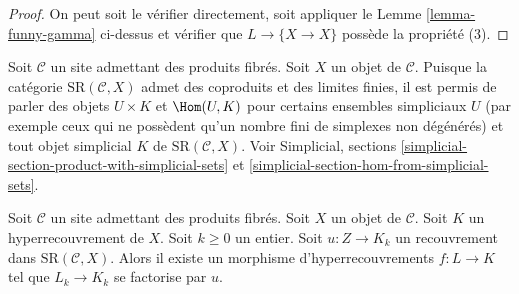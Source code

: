 \begin{proof}
On peut soit le vérifier directement, soit appliquer le
Lemme \ref{lemma-funny-gamma} ci-dessus et vérifier que $L \to \{X \to X\}$
possède la propriété (3).
\end{proof}


\noindent
Soit $\mathcal{C}$ un site admettant des produits fibrés.
Soit $X$ un objet de $\mathcal{C}$.
Puisque la catégorie $\text{SR}(\mathcal{C}, X)$ admet des coproduits et des
limites finies, il est permis de parler des objets
$U \times K$ et $\Hom(U, K)$ pour certains ensembles simpliciaux $U$
(par exemple ceux qui ne possèdent qu'un nombre fini de simplexes non dégénérés)
et tout objet simplicial $K$ de $\text{SR}(\mathcal{C}, X)$.
Voir Simplicial, sections
\ref{simplicial-section-product-with-simplicial-sets} et
\ref{simplicial-section-hom-from-simplicial-sets}.

\begin{lemma}
\label{lemma-covering}
Soit $\mathcal{C}$ un site admettant des produits fibrés.
Soit $X$ un objet de $\mathcal{C}$.
Soit $K$ un hyperrecouvrement de $X$.
Soit $k \geq 0$ un entier.
Soit $u : Z \to K_k$ un recouvrement
dans $\text{SR}(\mathcal{C}, X)$.
Alors il existe un morphisme d'hyperrecouvrements
$f: L \to K$ tel que $L_k \to K_k$
se factorise par $u$.
\end{lemma}

